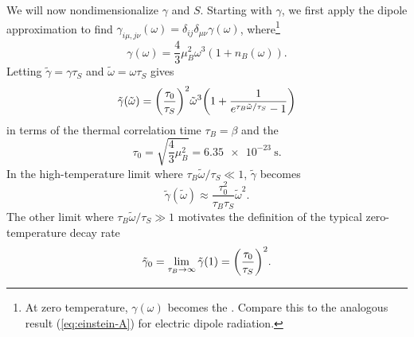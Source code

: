 \documentclass[../thesis.tex]{subfiles}
\begin{document}
We will now nondimensionalize $\gamma$ and $S$. Starting with $\gamma$, we first
apply the dipole approximation to find $\gamma_{i\mu,j\nu}(\omega) = \delta_{ij}
\delta_{\mu\nu} \gamma(\omega)$, where\footnote{%
  At zero temperature, $\gamma(\omega)$ becomes the . Compare this to the analogous result (\cref{eq:einstein-A}) for
  electric dipole radiation.
}
\begin{equation}
  \gamma(\omega)
  = \frac{4}{3}\mu_B^2 \omega^3 (1 + n_B(\omega)).
  \label{eq:gamma-dipole}
\end{equation}
Letting $\tilde{\gamma} = \gamma \tau_S$ and $\tilde{\omega} = \omega\tau_S$
gives
\begin{equation}
  \tilde{\gamma}(\tilde{\omega})
  = {\qty(\frac{\tau_0}{\tau_S})}^2 \tilde{\omega}^3
  \qty(1 + \frac{1}{e^{\tau_B \tilde{\omega} / \tau_S} - 1})
  \label{eq:gamma-nondim}
\end{equation}
in terms of the thermal correlation time $\tau_B = \beta$ and the
\begin{equation}
  \tau_0
  = \sqrt{\frac{4}{3}\mu_B^2}
  = \SI{6.35e-23}{\s}.
  \label{eq:tau0}
\end{equation}
In the high-temperature limit where $\tau_B\tilde{\omega}/\tau_S \ll 1$,
$\tilde{\gamma}$ becomes
\begin{equation}
  \tilde{\gamma}(\tilde{\omega})
  \approx \frac{\tau_0^2}{\tau_B \tau_S} \tilde{\omega}^2.
\end{equation}
The other limit where $\tau_B\tilde{\omega}/\tau_S \gg 1$ motivates the
definition of the typical zero-temperature decay rate
\begin{equation}
  \tilde{\gamma}_0
  = \lim_{\tau_B \to \infty} \tilde{\gamma}(1)
  = {\qty(\frac{\tau_0}{\tau_S})}^2.
\end{equation}
\end{document}
